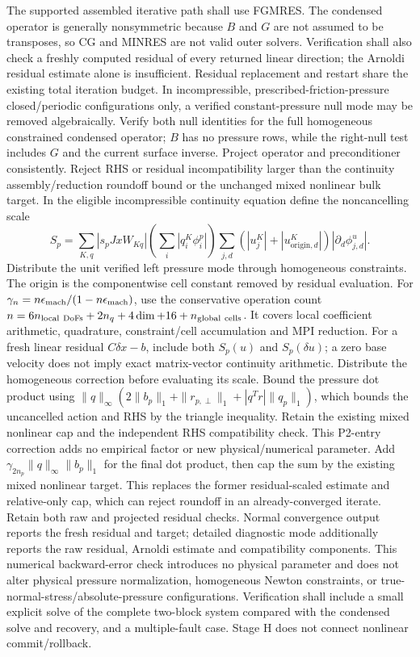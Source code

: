 \documentclass[11pt]{article}
\begin{document}
The supported assembled iterative path shall use FGMRES.  The condensed
operator is generally nonsymmetric because $B$ and $G$ are not assumed to be
transposes, so CG and MINRES are not valid outer solvers.  Verification shall
also check a freshly computed residual of every returned linear direction;
the Arnoldi residual estimate alone is insufficient. Residual replacement and
restart share the existing total iteration budget. In incompressible,
prescribed-friction-pressure closed/periodic configurations only, a verified
constant-pressure null mode may be removed algebraically. Verify both null
identities for the full homogeneous constrained condensed operator; $B$ has
no pressure rows, while the right-null test includes $G$ and the current
surface inverse. Project operator and preconditioner consistently. Reject
RHS or residual incompatibility larger than the continuity assembly/reduction
roundoff bound or the unchanged mixed nonlinear bulk target. In the eligible
incompressible continuity equation define the noncancelling scale
\[
 S_p=\sum_{K,q}|s_p JxW_{Kq}|\left(\sum_i|q_i^K\phi_i^p|\right)
       \sum_{j,d}(|u_j^K|+|u_{\mathrm{origin},d}^K|)
                         |\partial_d\phi^u_{j,d}|.
\]
Distribute the unit verified left pressure mode through homogeneous constraints.
The origin is the componentwise cell constant removed by residual evaluation.
For $\gamma_n=n\epsilon_{\rm mach}/(1-n\epsilon_{\rm mach})$, use the conservative
operation count $n=6n_{\rm local\ DoFs}+2n_q+4\dim+16+n_{\rm global\ cells}$.
It covers local coefficient arithmetic, quadrature, constraint/cell accumulation
and MPI reduction.
For a fresh linear residual $C\delta x-b$, include both $S_p(u)$ and
$S_p(\delta u)$; a zero base velocity does not imply exact matrix-vector
continuity arithmetic. Distribute the homogeneous correction before evaluating
its scale. Bound the pressure dot product using
$\|q\|_\infty(2\|b_p\|_1+\|r_{p,\perp}\|_1+
|q^Tr|\|q_p\|_1)$, which bounds the uncancelled action and RHS by the triangle
inequality. Retain the existing mixed nonlinear cap and the independent RHS
compatibility check. This P2-entry correction adds no empirical factor or new
physical/numerical parameter.
 Add $\gamma_{2n_p}\|q\|_\infty\|b_p\|_1$ for the final dot
product, then cap the sum by the existing mixed nonlinear target. This replaces
the former residual-scaled estimate and relative-only cap, which can reject
roundoff in an already-converged iterate. Retain both raw and projected residual checks. Normal convergence output
reports the fresh residual and target; detailed diagnostic mode additionally
reports the raw residual, Arnoldi estimate and compatibility components. This numerical
backward-error check introduces no physical parameter and does not alter
physical pressure normalization, homogeneous Newton constraints, or true-
normal-stress/absolute-pressure configurations. Verification shall
include a small explicit solve of the complete two-block system compared with
the condensed solve and recovery, and a multiple-fault case.  Stage H does not
connect nonlinear commit/rollback.
\end{document}
